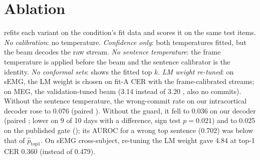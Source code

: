 \section{Ablation}
\label{app:ablation}

 refits each variant on the condition's fit data and scores it on the same test items. \emph{No calibration}: no temperature. \emph{Confidence only}: both temperatures fitted, but the beam decodes the raw stream. \emph{No sentence temperature}: the frame temperature is applied before the beam and the sentence calibrator is the identity. \emph{No conformal sets}:  shows the fitted top $k$. \emph{LM weight re-tuned}: on sEMG, the LM weight is chosen on fit-A CER with the frame-calibrated streams; on MEG, the validation-tuned beam (3.14 instead of 3.20 \ewpm{}, also no commits). Without the sentence temperature, the wrong-commit rate on our intracortical decoder rose to 0.076 (paired ). Without the guard, it fell to 0.036 on our decoder (paired ; lower on 9 of 10 days with a difference, sign test $p = 0.021$) and to 0.025 on the published gate (); its AUROC for a wrong top sentence (0.702) was below that of $\hat p_{\mathrm{top1}}$. On sEMG cross-subject, re-tuning the LM weight gave 4.84  \ewpm{} at top-1 CER 0.360 (instead of 0.479).

